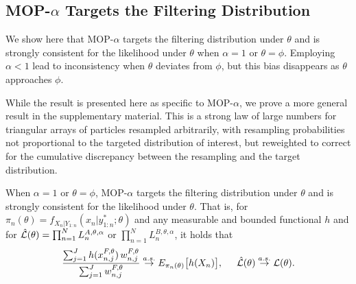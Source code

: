 \documentclass[9pt,twocolumn,pnasresearcharticle]{pnas-new}
\newcommand\arxiv[2]{#2} %
\begin{document}
\subsection{MOP-$\alpha$ Targets the Filtering Distribution}


We show here that MOP-$\alpha$ targets the filtering distribution under $\theta$ and is strongly consistent for the likelihood under $\theta$ when $\alpha=1$ or $\theta=\phi$.
Employing $\alpha<1$ lead to inconsistency when $\theta$ deviates from $\phi$, but this bias disappears as $\theta$ approaches $\phi$.

While the result is presented here as specific to MOP-$\alpha$, we prove a more general result in \arxiv{Appendix~\ref{appendix:targeting}}{the supplementary material}.
This is a strong law of large numbers for triangular arrays of particles resampled arbitrarily, with resampling probabilities not proportional to the targeted distribution of interest, but reweighted to correct for the cumulative discrepancy between the resampling and the target distribution.


\begin{thm}
    \label{thm:mop-targeting}
    When $\alpha=1$ or $\theta=\phi$, MOP-$\alpha$ targets the filtering distribution under $\theta$ and is strongly consistent for the likelihood under $\theta$. That is, for $\pi_n(\theta)=f_{X_{n}|Y_{1:n}}(x_n|y_{1:n}^* ; \theta)$ and any measurable and bounded functional $h$ and for $\hat{\mathcal{L}}(\theta) = \prod_{n=1}^N L_n^{A,\theta,\alpha}$ or $\prod_{n=1}^N L_n^{B,\theta,\alpha}$, it holds that
    \arxiv{}{\vspace*{-1.5mm}}
    \begin{equation} \nonumber
        \frac{\sum_{j=1}^J h(x_{n,j}^{F, \theta}) \, w_{n,j}^{F,\theta}}{\sum_{j=1}^J w_{n,j}^{F,\theta}} \stackrel{a.s.}{\to} E_{\pi_n(\theta)} \big[h(X_n)\big], \hspace{5mm} \hat\lik(\theta)  \stackrel{a.s.}{\to} \lik(\theta).
    \arxiv{}{\vspace*{-1.5mm}}
    \end{equation}
\end{thm}
\end{document}
